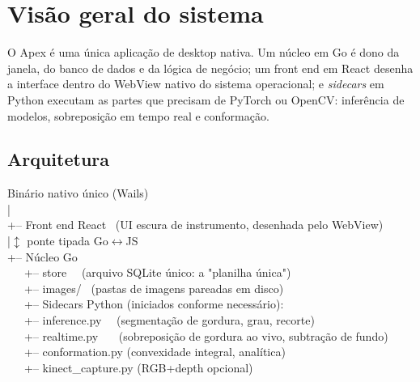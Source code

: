 \chapter{Visão geral do sistema}


\vspace{4pt}
O Apex é uma única aplicação de desktop nativa. Um núcleo em Go é dono da janela, do
banco de dados e da lógica de negócio; um front end em React desenha a interface
dentro do WebView nativo do sistema operacional; e \emph{sidecars} em Python executam
as partes que precisam de PyTorch ou OpenCV: inferência de modelos, sobreposição
em tempo real e conformação.

\section{Arquitetura}

\begin{center}
\begin{tcolorbox}[colback=codebg,colframe=hair,boxrule=0.6pt,arc=3pt,width=\linewidth]
\ttfamily\small
Binário nativo único (Wails)\\
\hspace*{1em}|\\
\hspace*{1em}+-- Front end React \ (UI escura de instrumento, desenhada pelo WebView)\\
\hspace*{1em}|\hspace*{4em}$\updownarrow$ ponte tipada Go$\leftrightarrow$JS\\
\hspace*{1em}+-- Núcleo Go\\
\hspace*{2em}\ \ \ +-- store \ \ (arquivo SQLite único: a "planilha única")\\
\hspace*{2em}\ \ \ +-- images/ \ (pastas de imagens pareadas em disco)\\
\hspace*{2em}\ \ \ +-- Sidecars Python (iniciados conforme necessário):\\
\hspace*{4em}\ \ \ +-- inference.py \ \ (segmentação de gordura, grau, recorte)\\
\hspace*{4em}\ \ \ +-- realtime.py \ \ \ (sobreposição de gordura ao vivo, subtração de fundo)\\
\hspace*{4em}\ \ \ +-- conformation.py (convexidade integral, analítica)\\
\hspace*{4em}\ \ \ +-- kinect\_capture.py (RGB+depth opcional)
\end{tcolorbox}
\end{center}

